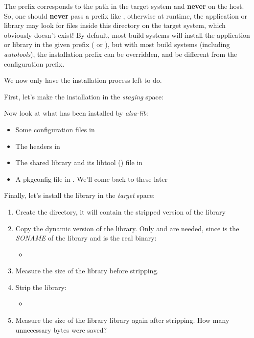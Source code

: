 The prefix corresponds to the path in the target system and {\bf
  never} on the host. So, one should {\bf never} pass a prefix like
, otherwise at
runtime, the application or library may look for files inside this
directory on the target system, which obviously doesn't exist! By
default, most build systems will install the application or library in
the given prefix ( or ), but with most
build systems (including {\em autotools}), the installation prefix can
be overridden, and be different from the configuration prefix.

We now only have the installation process left to do.

First, let's make the installation in the {\em staging} space:

Now look at what has been installed by {\em alsa-lib}:
\begin{itemize}
\item Some configuration files in 
\item The headers in 
\item The shared library and its libtool () file in 
\item A pkgconfig file in . We'll come back
  to these later
\end{itemize}

Finally, let's install the library in the {\em target} space:

\begin{enumerate}
\item Create the  directory, it will contain the
  stripped version of the library
\item Copy the dynamic version of the library. Only
   and  are needed,
  since  is the {\em SONAME} of the library and
   is the real binary:
  \begin{itemize}
  \item {}
  \end{itemize}
\item Measure the size of the 
  library before stripping.
\item Strip the library:
  \begin{itemize}
  \item {}
  \end{itemize}
\item Measure the size of the 
  library library again after stripping. How many unnecessary bytes
  were saved?
\end{enumerate}

